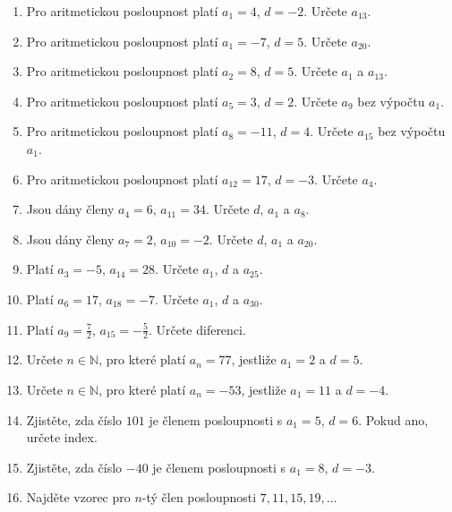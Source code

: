 \documentclass[11pt,a4paper]{article}
\begin{document}
\begin{enumerate}[resume]
    \item Pro aritmetickou posloupnost platí $a_1=4$, $d=-2$. Určete $a_{13}$.

    \item Pro aritmetickou posloupnost platí $a_1=-7$, $d=5$. Určete $a_{20}$.

    \item Pro aritmetickou posloupnost platí $a_2=8$, $d=5$. Určete $a_1$ a $a_{13}$.

    \item Pro aritmetickou posloupnost platí $a_5=3$, $d=2$. Určete $a_9$ bez výpočtu $a_1$.

    \item Pro aritmetickou posloupnost platí $a_8=-11$, $d=4$. Určete $a_{15}$ bez výpočtu $a_1$.

    \item Pro aritmetickou posloupnost platí $a_{12}=17$, $d=-3$. Určete $a_4$.

    \item Jsou dány členy $a_4=6$, $a_{11}=34$. Určete $d$, $a_1$ a $a_8$.

    \item Jsou dány členy $a_7=2$, $a_{10}=-2$. Určete $d$, $a_1$ a $a_{20}$.

    \item Platí $a_3=-5$, $a_{14}=28$. Určete $a_1$, $d$ a $a_{25}$.

    \item Platí $a_6=17$, $a_{18}=-7$. Určete $a_1$, $d$ a $a_{30}$.

    \item Platí $a_9=\frac72$, $a_{15}=-\frac52$. Určete diferenci.

    \item Určete $n\in\mathbb{N}$, pro které platí $a_n=77$, jestliže $a_1=2$ a $d=5$.

    \item Určete $n\in\mathbb{N}$, pro které platí $a_n=-53$, jestliže $a_1=11$ a $d=-4$.

    \item Zjistěte, zda číslo $101$ je členem posloupnosti s $a_1=5$, $d=6$. Pokud ano, určete index.

    \item Zjistěte, zda číslo $-40$ je členem posloupnosti s $a_1=8$, $d=-3$.

    \item Najděte vzorec pro $n$-tý člen posloupnosti $7, 11, 15, 19,\ldots$


\end{enumerate}
\end{document}
